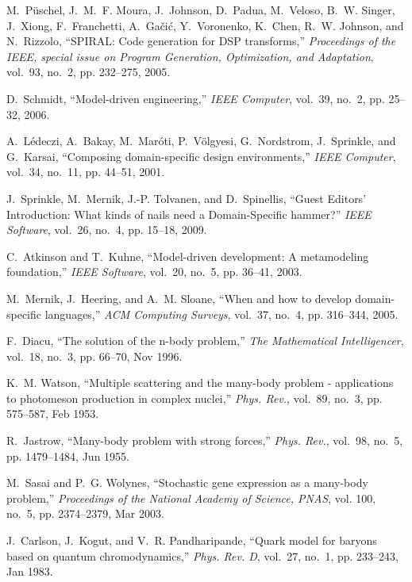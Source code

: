 \documentclass[draftclsnofoot]{elsarticle}
\begin{document}
\begin{thebibliography}{10}
M.~P{\"u}schel, J.~M.~F. Moura, J.~Johnson, D.~Padua, M.~Veloso, B.~W. Singer,
  J.~Xiong, F.~Franchetti, A.~Ga\v{c}i\'{c}, Y.~Voronenko, K.~Chen, R.~W.
  Johnson, and N.~Rizzolo, ``{SPIRAL}: Code generation for {DSP} transforms,''
  \emph{Proceedings of the IEEE, special issue on Program Generation,
  Optimization, and Adaptation}, vol.~93, no.~2, pp. 232--275, 2005.

D.~Schmidt, ``Model-driven engineering,'' \emph{IEEE Computer}, vol.~39, no.~2,
  pp. 25--32, 2006.

A.~L\'{e}deczi, A.~Bakay, M.~Mar\'{o}ti, P.~V\"{o}lgyesi, G.~Nordstrom,
  J.~Sprinkle, and G.~Karsai, ``Composing domain-specific design
  environments,'' \emph{IEEE Computer}, vol.~34, no.~11, pp. 44--51, 2001.

J.~Sprinkle, M.~Mernik, J.-P. Tolvanen, and D.~Spinellis, ``{Guest Editors'
  Introduction}: {W}hat kinds of nails need a {D}omain-{S}pecific hammer?''
  \emph{IEEE Software}, vol.~26, no.~4, pp. 15--18, 2009.

C.~Atkinson and T.~Kuhne, ``Model-driven development: {A} metamodeling
  foundation,'' \emph{IEEE Software}, vol.~20, no.~5, pp. 36--41, 2003.

M.~Mernik, J.~Heering, and A.~M. Sloane, ``When and how to develop
  domain-specific languages,'' \emph{ACM Computing Surveys}, vol.~37, no.~4,
  pp. 316--344, 2005.

F.~Diacu, ``The solution of the n-body problem,'' \emph{The Mathematical
  Intelligencer}, vol.~18, no.~3, pp. 66--70, Nov 1996.

K.~M. Watson, ``Multiple scattering and the many-body problem - applications to
  photomeson production in complex nuclei,'' \emph{Phys. Rev.}, vol.~89, no.~3,
  pp. 575--587, Feb 1953.

R.~Jastrow, ``Many-body problem with strong forces,'' \emph{Phys. Rev.},
  vol.~98, no.~5, pp. 1479--1484, Jun 1955.

M.~Sasai and P.~G. Wolynes, ``Stochastic gene expression as a many-body
  problem,'' \emph{Proceedings of the National Academy of Science, PNAS}, vol.
  100, no.~5, pp. 2374--2379, Mar 2003.

J.~Carlson, J.~Kogut, and V.~R. Pandharipande, ``Quark model for baryons based
  on quantum chromodynamics,'' \emph{Phys. Rev. D}, vol.~27, no.~1, pp.
  233--243, Jan 1983.


\end{thebibliography}
\end{document}
